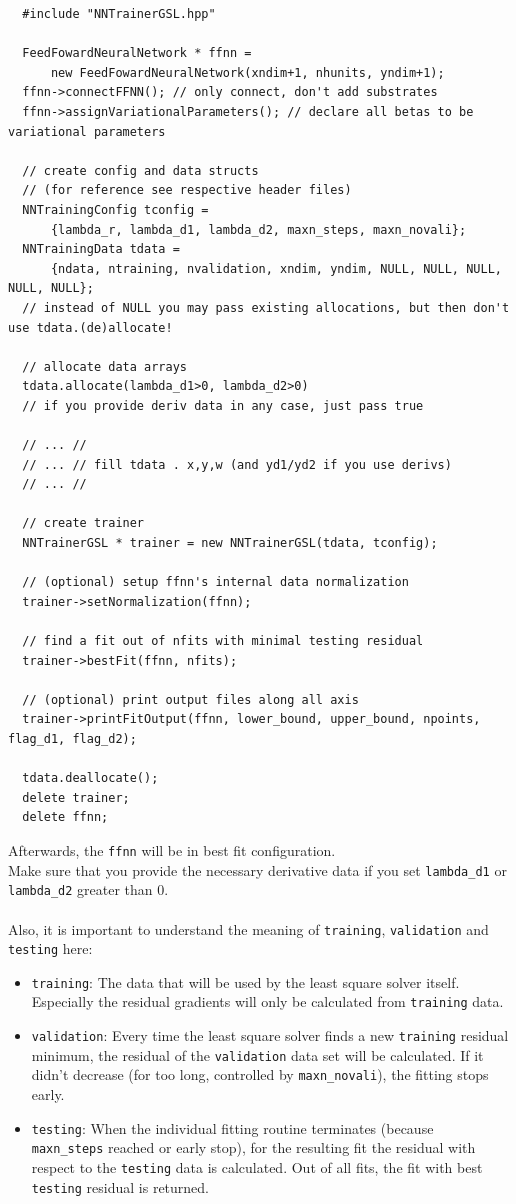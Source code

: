 \documentclass[11pt,a4paper,twoside]{article}
\begin{document}
\begin{lstlisting}
  #include "NNTrainerGSL.hpp"

  FeedFowardNeuralNetwork * ffnn =
      new FeedFowardNeuralNetwork(xndim+1, nhunits, yndim+1);
  ffnn->connectFFNN(); // only connect, don't add substrates
  ffnn->assignVariationalParameters(); // declare all betas to be variational parameters

  // create config and data structs
  // (for reference see respective header files)
  NNTrainingConfig tconfig =
      {lambda_r, lambda_d1, lambda_d2, maxn_steps, maxn_novali};
  NNTrainingData tdata =
      {ndata, ntraining, nvalidation, xndim, yndim, NULL, NULL, NULL, NULL, NULL};
  // instead of NULL you may pass existing allocations, but then don't use tdata.(de)allocate!  

  // allocate data arrays
  tdata.allocate(lambda_d1>0, lambda_d2>0)
  // if you provide deriv data in any case, just pass true

  // ... //
  // ... // fill tdata . x,y,w (and yd1/yd2 if you use derivs)
  // ... //

  // create trainer
  NNTrainerGSL * trainer = new NNTrainerGSL(tdata, tconfig);

  // (optional) setup ffnn's internal data normalization
  trainer->setNormalization(ffnn);

  // find a fit out of nfits with minimal testing residual
  trainer->bestFit(ffnn, nfits);

  // (optional) print output files along all axis
  trainer->printFitOutput(ffnn, lower_bound, upper_bound, npoints, flag_d1, flag_d2);

  tdata.deallocate();
  delete trainer;
  delete ffnn;

\end{lstlisting}
Afterwards, the \verb+ffnn+ will be in best fit configuration.
\\Make sure that you provide the necessary derivative data if you set
\verb+lambda_d1+ or \verb+lambda_d2+ greater than 0.
\\\\Also, it is important to understand the meaning of \verb+training+, \verb+validation+ and \verb+testing+
here:
\begin{itemize}
\item \verb+training+: The data that will be used by the least square solver itself.
  Especially the residual gradients will only be calculated from \verb+training+ data.
\item \verb+validation+: Every time the least square solver finds a new \verb+training+
  residual minimum, the residual of the \verb+validation+ data set will be calculated. If
  it didn't decrease (for too long, controlled by \verb+maxn_novali+), the
  fitting stops early.
\item \verb+testing+: When the individual fitting routine terminates (because
  \\\verb+maxn_steps+ reached or early stop), for the resulting fit the residual with
  respect to the \verb+testing+ data is calculated. Out of all fits, the fit with best
  \verb+testing+ residual is returned.
\end{itemize}
\end{document}
